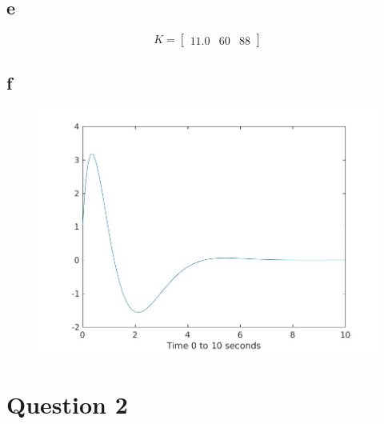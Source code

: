 \documentclass[11pt]{article}
\begin{document}
\subsection*{e}
    $$K=\left[\begin{array}{ccc} 11.0 & 60 & 88 \end{array}\right]$$
\subsection*{f}
\begin{figure}[H]
    \includegraphics[width=.7\textwidth]{q1f.jpg}
\end{figure}
\section*{Question 2}
\end{document}
